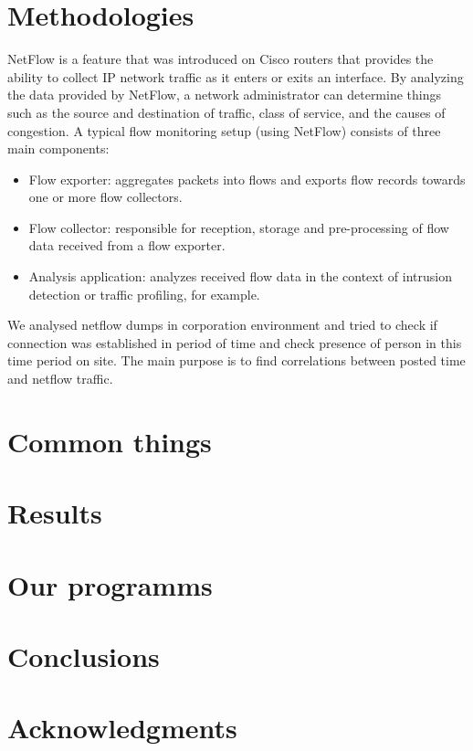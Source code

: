 \documentclass[12pt,a4paper]{report}
\begin{document}
\section{Methodologies}
NetFlow is a feature that was introduced on Cisco routers that provides the ability to collect IP network traffic as it enters or exits an interface. By analyzing the data provided by NetFlow, a network administrator can determine things such as the source and destination of traffic, class of service, and the causes of congestion. A typical flow monitoring setup (using NetFlow) consists of three main components:\cite{methodologies1}
\begin{itemize}
	\item{Flow exporter: aggregates packets into flows and exports flow records towards one or more flow collectors.}
	\item{Flow collector: responsible for reception, storage and pre-processing of flow data received from a flow exporter.}
	\item{Analysis application: analyzes received flow data in the context of intrusion detection or traffic profiling, for example.}
\end{itemize}

We analysed netflow dumps in corporation environment and tried to check if connection was established in period of time and check presence of person in this time period on site. The main purpose is to find correlations between posted time and netflow traffic.


\section{Common things}





\section{Results}
\section{Our programms}
\section{Conclusions}
\section{Acknowledgments}

\appendix

\end{document}
